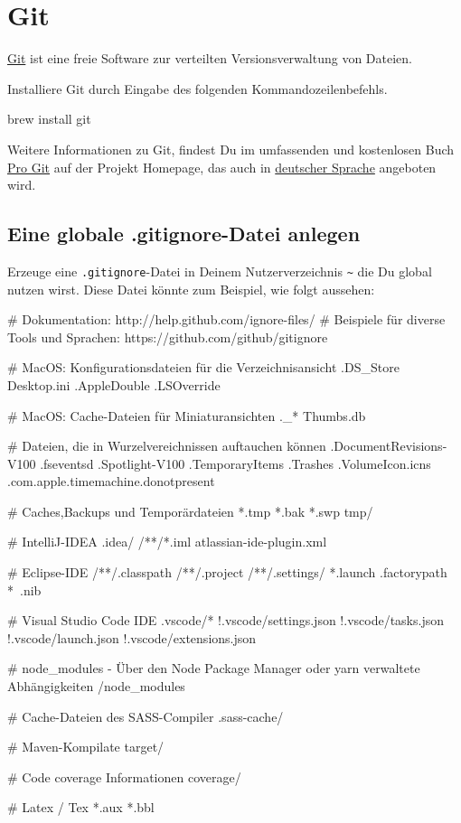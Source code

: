 \documentclass[]{article}
\newcommand{\code}[1]{\texttt{#1}}
\begin{document}
\section{Git}
\href{https://git-scm.com/}{Git} ist eine freie Software zur verteilten Versionsverwaltung von Dateien.

Installiere Git durch Eingabe des folgenden Kommandozeilenbefehls.
\begin{bashcode}
brew install git
\end{bashcode}

Weitere Informationen zu Git, findest Du im umfassenden und kostenlosen Buch \href{https://git-scm.com/book/en/v2}{Pro Git} auf der Projekt Homepage, das auch in \href{https://git-scm.com/book/de/v2/}{deutscher Sprache} angeboten wird.

\subsection{Eine globale .gitignore-Datei anlegen}
Erzeuge eine \code{.gitignore}-Datei in Deinem Nutzerverzeichnis \code{\~} die Du global nutzen wirst. Diese Datei könnte zum Beispiel, wie folgt aussehen:
\begin{bashcode}
# Dokumentation: http://help.github.com/ignore-files/
# Beispiele für diverse Tools und Sprachen: https://github.com/github/gitignore

# MacOS: Konfigurationsdateien für die Verzeichnisansicht
.DS_Store
Desktop.ini
.AppleDouble
.LSOverride

# MacOS: Cache-Dateien für Miniaturansichten
._*
Thumbs.db

# Dateien, die in Wurzelvereichnissen auftauchen können
.DocumentRevisions-V100
.fseventsd
.Spotlight-V100
.TemporaryItems
.Trashes
.VolumeIcon.icns
.com.apple.timemachine.donotpresent

# Caches,Backups und Temporärdateien
*.tmp
*.bak
*.swp
tmp/

# IntelliJ-IDEA
.idea/
/**/*.iml
atlassian-ide-plugin.xml

# Eclipse-IDE
/**/.classpath
/**/.project
/**/.settings/
*.launch
.factorypath
*~.nib

 # Visual Studio Code IDE
.vscode/*
!.vscode/settings.json
!.vscode/tasks.json
!.vscode/launch.json
!.vscode/extensions.json

# node_modules - Über den Node Package Manager oder yarn verwaltete Abhängigkeiten
/node_modules

# Cache-Dateien des SASS-Compiler
.sass-cache/

# Maven-Kompilate
target/

# Code coverage Informationen
coverage/

 # Latex / Tex
*.aux
*.bbl

\end{bashcode}
\end{document}

